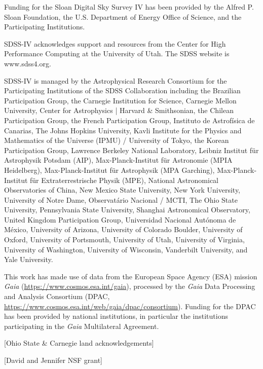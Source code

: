 \documentclass[twocolumn,twocolappendix,linenumbers,trackchanges]{aastex631}
\begin{document}
\begin{acknowledgments}
    
    Funding for the Sloan Digital Sky 
    Survey IV has been provided by the 
    Alfred P. Sloan Foundation, the U.S. 
    Department of Energy Office of 
    Science, and the Participating 
    Institutions. 
    
    SDSS-IV acknowledges support and 
    resources from the Center for High 
    Performance Computing  at the 
    University of Utah. The SDSS 
    website is www.sdss4.org.
    
    SDSS-IV is managed by the 
    Astrophysical Research Consortium 
    for the Participating Institutions 
    of the SDSS Collaboration including 
    the Brazilian Participation Group, 
    the Carnegie Institution for Science, 
    Carnegie Mellon University, Center for 
    Astrophysics | Harvard \& 
    Smithsonian, the Chilean Participation 
    Group, the French Participation Group, 
    Instituto de Astrof\'isica de 
    Canarias, The Johns Hopkins 
    University, Kavli Institute for the 
    Physics and Mathematics of the 
    Universe (IPMU) / University of 
    Tokyo, the Korean Participation Group, 
    Lawrence Berkeley National Laboratory, 
    Leibniz Institut f\"ur Astrophysik 
    Potsdam (AIP),  Max-Planck-Institut 
    f\"ur Astronomie (MPIA Heidelberg), 
    Max-Planck-Institut f\"ur 
    Astrophysik (MPA Garching), 
    Max-Planck-Institut f\"ur 
    Extraterrestrische Physik (MPE), 
    National Astronomical Observatories of 
    China, New Mexico State University, 
    New York University, University of 
    Notre Dame, Observat\'ario 
    Nacional / MCTI, The Ohio State 
    University, Pennsylvania State 
    University, Shanghai 
    Astronomical Observatory, United 
    Kingdom Participation Group, 
    Universidad Nacional Aut\'onoma 
    de M\'exico, University of Arizona, 
    University of Colorado Boulder, 
    University of Oxford, University of 
    Portsmouth, University of Utah, 
    University of Virginia, University 
    of Washington, University of 
    Wisconsin, Vanderbilt University, 
    and Yale University.
    
    This work has made use of data from the European Space Agency (ESA) mission
    {\it Gaia} (\url{https://www.cosmos.esa.int/gaia}), processed by the {\it Gaia}
    Data Processing and Analysis Consortium (DPAC,
    \url{https://www.cosmos.esa.int/web/gaia/dpac/consortium}). Funding for the DPAC
    has been provided by national institutions, in particular the institutions
    participating in the {\it Gaia} Multilateral Agreement.

    [Ohio State \& Carnegie land acknowledgements]

    [David and Jennifer NSF grant]

\end{acknowledgments}
\end{document}
